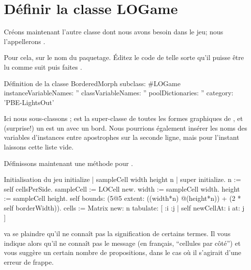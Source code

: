 \documentclass[a4paper,10pt,twoside]{book}
\begin{document}

\section{Définir la classe LOGame}

Créons maintenant l'autre classe dont nous avons besoin dans le jeu; nous l'appellerons .

Pour cela, \clickz{} sur le nom du paquetage.
Éditez le code de telle sorte qu'il puisse être lu comme suit puis faites .

\begin{classdef}[sbegame]{Définition de la classe }
BorderedMorph subclass: #LOGame
   instanceVariableNames: ''
   classVariableNames: ''
   poolDictionaries: ''
   category: 'PBE-LightsOut'
\end{classdef}

Ici nous sous-classons ;  est la
super-classe de toutes les formes graphiques de \pharo, et (surprise!)
un  est un  avec un bord.  
Nous pourrions également insérer les noms des variables d'instances
entre apostrophes sur la seconde ligne, mais pour l'instant 
laissons cette liste vide.

Définissons maintenant une méthode  pour .


\begin{numMethod}[sbegameinitialize]{Initialisation du jeu}
initialize
   | sampleCell width height n |
   super initialize.
   n := self cellsPerSide.
   sampleCell := LOCell new.
   width := sampleCell width.
   height := sampleCell height.
   self bounds: (5@5 extent: ((width*n) @(height*n)) + (2 * self borderWidth)).
   cells := Matrix new: n tabulate: [ :i :j | self newCellAt: i at: j ]
\end{numMethod}


\pharo va se plaindre qu'il ne connaît pas la signification de
certains termes.
Il vous indique alors qu'il ne connaît pas le message
 (en français, ``cellules par côté'') et
vous suggère un certain nombre de propositions, dans le cas où il
s'agirait d'une erreur de frappe.
\end{document}
